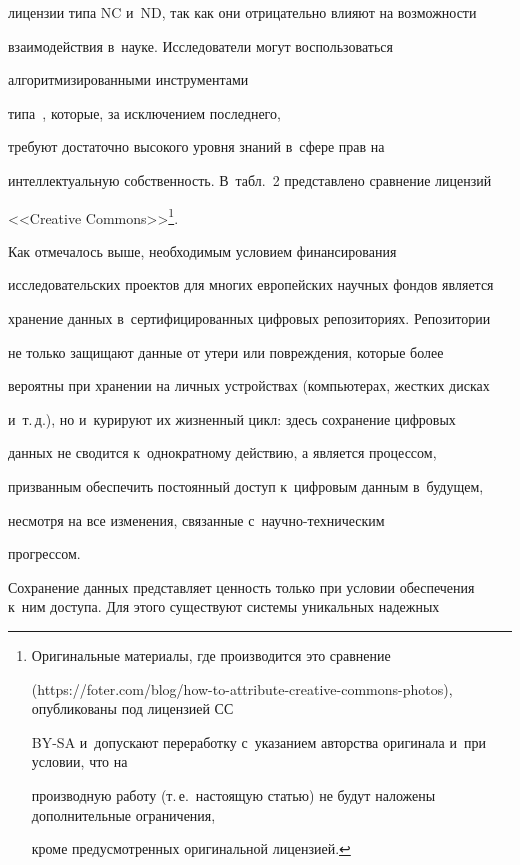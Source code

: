 лицензии типа NC и~ND, так как они отрицательно влияют на возможности 

взаимодействия в~науке. Исследователи могут воспользоваться 

алгоритмизированными инструментами  

типа~\cite{29-nur, 30-nur, 31-nur, 32-nur}, которые, за исключением последнего, 

требуют достаточно высокого уровня знаний в~сфере прав на 

интеллектуальную собственность. В~табл.~2 представлено сравнение лицензий 

<<Creative Commons>>\footnote{Оригинальные материалы, где производится это сравнение 

({\sf https://foter.com/blog/how-to-attribute-creative-commons-photos}), опубликованы под лицензией СС  

BY-SA и~допускают переработку с~указанием авторства оригинала и~при условии, что на 

производную работу (т.\,е.\ настоящую статью) не будут наложены дополнительные ограничения, 

кроме предусмотренных оригинальной лицензией.}.

  



  

  Как отмечалось выше, необходимым условием финансирования 

исследовательских проектов для многих европейских научных фондов является 

хранение данных в~сертифицированных цифровых репозиториях. Репозитории 

не только защищают данные от утери или повреждения, которые более 

вероятны при хранении на личных устройствах (компьютерах, жестких дисках 

и~т.\,д.), но и~курируют их жизненный цикл: здесь сохранение цифровых 

данных не сводится к~однократному действию, а является процессом, 

призванным обеспечить постоянный доступ к~цифровым данным в~будущем, 

несмотря на все изменения, связанные с~на\-уч\-но-тех\-ни\-че\-ским 

прогрессом.

  

  Сохранение данных представляет ценность только при условии обеспечения к~ним доступа. Для этого существуют системы уникальных надежных 

